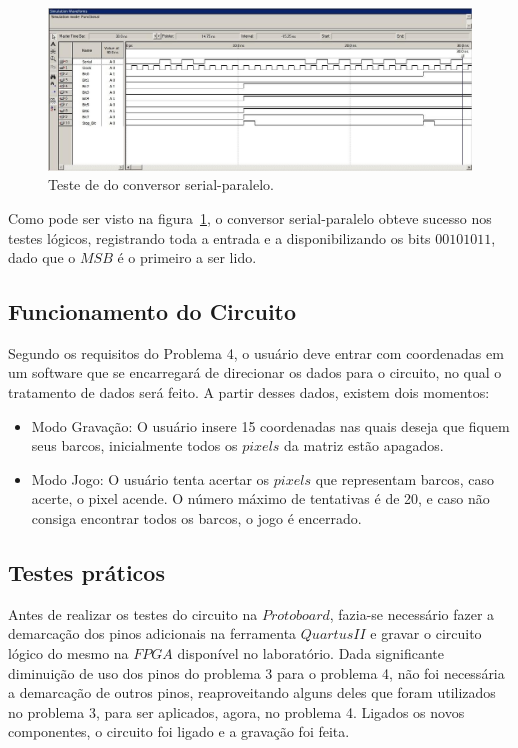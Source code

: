 \documentclass[12pt]{article}
\begin{document}
\begin{figure}[h]
\centering
\includegraphics[width=1\textwidth]{img/teste_sp.jpg}
\caption{Teste de do conversor serial-paralelo.}
\label{fig:sptest}
\end{figure}


Como pode ser visto na figura~\ref{fig:sptest}, o conversor serial-paralelo obteve sucesso nos testes lógicos, registrando toda a entrada e a disponibilizando os bits $00101011$, dado que o $MSB$ é o primeiro a ser lido.


\subsection{Funcionamento do Circuito}
Segundo os requisitos do Problema 4, o usuário deve entrar com coordenadas em um software que se encarregará de direcionar os dados para o circuito, no qual o tratamento de dados será feito. A partir desses dados, existem dois momentos:

\begin{itemize}
\item Modo Gravação: O usuário insere 15 coordenadas nas quais deseja que fiquem seus barcos, inicialmente todos os $pixels$ da matriz estão apagados.
\item Modo Jogo: O usuário tenta acertar os $pixels$ que representam barcos, caso acerte, o pixel acende. O número máximo de tentativas é de 20, e caso não consiga encontrar todos os barcos, o jogo é encerrado.
\end{itemize}


\subsection{Testes práticos}
Antes de realizar os testes do circuito na $Protoboard$, fazia-se necessário fazer a demarcação dos pinos adicionais na ferramenta $Quartus II$ e  gravar o circuito lógico do mesmo na $FPGA$ disponível no laboratório. Dada significante diminuição de uso dos pinos do problema 3 para o problema 4, não foi necessária a demarcação  de outros pinos, reaproveitando alguns deles que foram utilizados no problema 3, para ser aplicados, agora, no problema 4. Ligados os novos componentes, o circuito foi ligado e a gravação foi feita.
\end{document}
